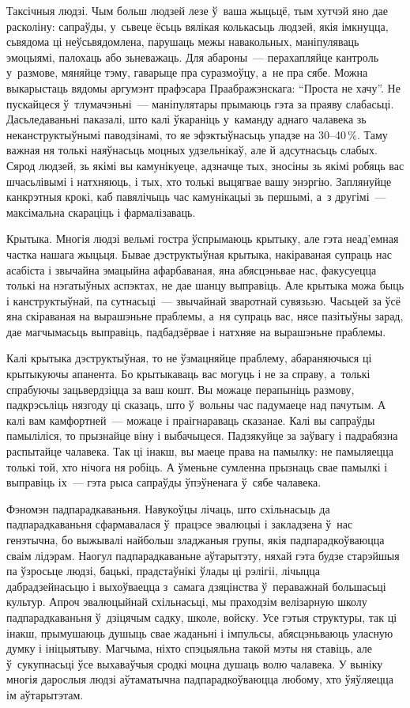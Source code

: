 Таксічныя людзі. Чым больш людзей лезе ў~ваша жыцьцё, тым хутчэй яно дае расколіну: сапраўды, у~сьвеце ёсьць вялікая колькасьць людзей, якія імкнуцца, сьвядома ці неўсьвядомлена, парушаць межы навакольных, маніпуляваць эмоцыямі, палохаць або зьневажаць. Для абароны~--- перахапляйце кантроль у~размове, мяняйце тэму, гаварыце пра суразмоўцу, а~не пра сябе. Можна выкарыстаць вядомы аргумэнт прафэсара Праабражэнскага: ``Проста не хачу''. Не пускайцеся ў~тлумачэньні~--- маніпулятары прымаюць гэта за праяву слабасьці. Дасьледаваньні паказалі, што калі ўкараніць у~каманду аднаго чалавека зь неканструктыўнымі паводзінамі, то яе эфэктыўнасьць упадзе на 30--40\,\%. Таму важная ня толькі наяўнасьць моцных удзельнікаў, але й адсутнасьць слабых. Сярод людзей, зь якімі вы камунікуеце, адзначце тых, зносіны зь якімі робяць вас шчасьлівымі і натхняюць, і тых, хто толькі выцягвае вашу энэргію. Заплянуйце канкрэтныя крокі, каб павялічыць час камунікацыі зь першымі, а~з другімі~--- максімальна скараціць і фармалізаваць.

Крытыка. Многія людзі вельмі гостра ўспрымаюць крытыку, але гэта неад'емная частка нашага жыцьця. Бывае дэструктыўная крытыка, накіраваная супраць нас асабіста і звычайна эмацыйна афарбаваная, яна абясцэньвае нас, факусуецца толькі на нэгатыўных аспэктах, не дае шанцу выправіць. Але крытыка можа быць і канструктыўнай, па сутнасьці~--- звычайнай зваротнай сувязьзю. Часьцей за ўсё яна скіраваная на вырашэньне праблемы, а~ня супраць вас, нясе пазітыўны зарад, дае магчымасьць выправіць, падбадзёрвае і натхняе на вырашэньне праблемы.

Калі крытыка дэструктыўная, то не ўзмацняйце праблему, абараняючыся ці крытыкуючы апанента. Бо крытыкаваць вас могуць і не за справу, а~толькі спрабуючы зацьвердзіцца за ваш кошт. Вы можаце перапыніць размову, падкрэсьліць нязгоду ці сказаць, што ў~вольны час падумаеце над пачутым. А калі вам камфортней~--- можаце і праігнараваць сказанае. Калі вы сапраўды памыліліся, то прызнайце віну і выбачыцеся. Падзякуйце за заўвагу і падрабязна распытайце чалавека. Так ці інакш, вы маеце права на памылку: не памыляецца толькі той, хто нічога ня робіць. А ўменьне сумленна прызнаць свае памылкі і выправіць іх~--- гэта рыса сапраўды ўпэўненага ў~сябе чалавека.

Фэномэн падпарадкаваньня. Навукоўцы лічаць, што схільнасьць да падпарадкаваньня сфармавалася ў~працэсе эвалюцыі і закладзена ў~нас генэтычна, бо выжывалі найбольш зладжаныя групы, якія падпарадкоўваюцца сваім лідэрам. Наогул падпарадкаваньне аўтарытэту, няхай гэта будзе старэйшыя па ўзросьце людзі, бацькі, прадстаўнікі ўлады ці рэлігіі, лічыцца дабрадзейнасьцю і выхоўваецца з~самага дзяцінства ў~пераважнай большасьці культур. Апроч эвалюцыйнай схільнасьці, мы праходзім велізарную школу падпарадкаваньня ў~дзіцячым садку, школе, войску. Усе гэтыя структуры, так ці інакш, прымушаюць душыць свае жаданьні і імпульсы, абясцэньваюць уласную думку і ініцыятыву. Магчыма, ніхто спэцыяльна такой мэты ня ставіць, але ў~сукупнасьці ўсе выхаваўчыя сродкі моцна душаць волю чалавека. У выніку многія дарослыя людзі аўтаматычна падпарадкоўваюцца любому, хто ўяўляецца ім аўтарытэтам.

